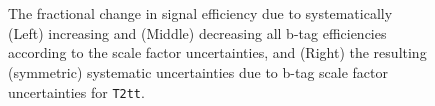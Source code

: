\begin{figure}[h!]
  \begin{center}
    \\
    \\
    \caption{\label{fig:sms-btag-t2tt}The fractional change in signal
      efficiency due to systematically (Left) increasing and (Middle)
      decreasing all b-tag efficiencies according to the scale factor
      uncertainties, and (Right) the resulting (symmetric) systematic
      uncertainties due to b-tag scale factor uncertainties for
      \texttt{T2tt}.} 
  \end{center}
\end{figure}

